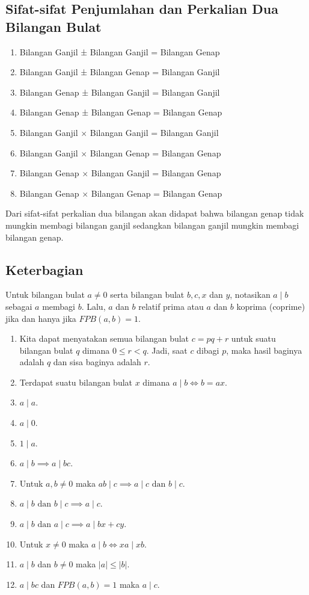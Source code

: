 \documentclass[11pt]{scrartcl}
\begin{document}
	\subsection{Sifat-sifat Penjumlahan dan Perkalian Dua Bilangan Bulat}
    \begin{enumerate}
        \item Bilangan Ganjil ± Bilangan Ganjil = Bilangan Genap 
        \item Bilangan Ganjil ± Bilangan Genap = Bilangan Ganjil 
        \item Bilangan Genap ± Bilangan Ganjil = Bilangan Ganjil 
        \item Bilangan Genap ± Bilangan Genap = Bilangan Genap 
        \item Bilangan Ganjil $\times$ Bilangan Ganjil = Bilangan Ganjil 
        \item Bilangan Ganjil $\times$ Bilangan Genap = Bilangan Genap 
        \item Bilangan Genap $\times$ Bilangan Ganjil = Bilangan Genap 
        \item Bilangan Genap $\times$ Bilangan Genap = Bilangan Genap
    \end{enumerate}
    Dari sifat-sifat perkalian dua bilangan akan didapat bahwa bilangan genap tidak mungkin membagi 
    bilangan ganjil sedangkan bilangan ganjil mungkin membagi bilangan genap. 
    \subsection{Keterbagian}
    Untuk bilangan bulat $a \neq 0$ serta bilangan bulat $b,c,x$ dan $y$, notasikan $a \mid b$ sebagai $a$ membagi $b$. Lalu, $a$ dan $b$ relatif prima atau $a$ dan $b$ koprima (coprime) jika dan hanya jika $FPB(a,b)=1$.
    \begin{enumerate}
        \item Kita dapat menyatakan semua bilangan bulat $c = pq+r$ untuk suatu bilangan bulat $q$ dimana $0 \le r < q$. Jadi, saat $c$ dibagi $p$, maka hasil baginya adalah $q$ dan sisa baginya adalah $r$.
        \item Terdapat suatu bilangan bulat $x$ dimana $a \mid b \iff b=ax$.
        \item $a \mid a$.
        \item $a \mid 0$.
        \item $1 \mid a$.
        \item $a \mid b \implies a \mid bc$.
        \item Untuk $a,b \neq 0$ maka $ab \mid c \implies a \mid c \text{ dan } b \mid c$.
        \item $a \mid b \text{ dan } b \mid c \implies a \mid c$.
        \item $a \mid b \text{ dan } a \mid c \implies a \mid bx + cy$.
        \item Untuk $x \neq 0$ maka $a \mid b \iff xa \mid xb$.
        \item $a \mid b$ dan $b \neq 0$ maka $|a| \le |b|$.
        \item $a \mid bc$ dan $FPB(a,b)=1$ maka $a\mid c$.
    \end{enumerate}
\end{document}

